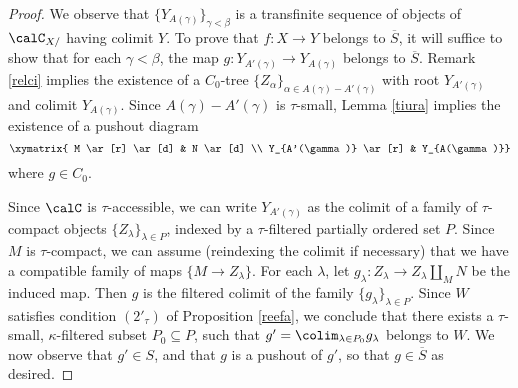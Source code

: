 \begin{Model Categories}
\begin{proof}
We observe that $\{ Y_{A(\gamma)} \}_{\gamma < \beta}$ is a transfinite sequence of objects of
$\calC_{X/}$ having colimit $Y$. To prove that $f: X \rightarrow Y$ belongs to $\overline{S}$, it will suffice to show that for each $\gamma < \beta$, the map $g: Y_{A'(\gamma)} \rightarrow Y_{A(\gamma)}$ belongs to $\overline{S}$. Remark \ref{relci} implies the existence of a $C_0$-tree
$\{ Z_{\alpha} \}_{\alpha \in A(\gamma) - A'(\gamma)}$ with root $Y_{A'(\gamma)}$ and colimit $Y_{A(\gamma)}$. Since $A(\gamma) - A'(\gamma)$ is $\tau$-small, Lemma \ref{tiura} implies the existence of a pushout diagram 
$$ \xymatrix{ M \ar[r] \ar[d] & N \ar[d] \\
Y_{A'(\gamma)} \ar[r] & Y_{A(\gamma)}}$$
where $g \in C_0$. 

Since $\calC$ is $\tau$-accessible, we can write $Y_{A'(\gamma)}$ as the colimit of a family of $\tau$-compact objects $\{ Z_{\lambda} \}_{\lambda \in P}$, indexed by a $\tau$-filtered partially ordered set $P$. Since $M$ is $\tau$-compact, we can assume (reindexing the colimit if necessary) that we have a compatible family of maps $\{ M \rightarrow Z_{\lambda} \}$. For each $\lambda$, let $g_{\lambda}: Z_{\lambda} \rightarrow Z_{\lambda} \coprod_{M} N$ be the induced map. Then $g$ is the filtered colimit of the family $\{ g_{\lambda} \}_{\lambda \in P}$. Since $W$ satisfies condition
$(2'_{\tau})$ of Proposition \ref{reefa}, we conclude that there exists a $\tau$-small, $\kappa$-filtered subset $P_0 \subseteq P$, such that $g' = \colim_{\lambda \in P_0} g_{\lambda}$ belongs to $W$. We now observe that $g' \in S$, and that $g$ is a pushout of $g'$, so that $g \in \overline{S}$ as desired.
\end{proof}


\end{Model Categories}

